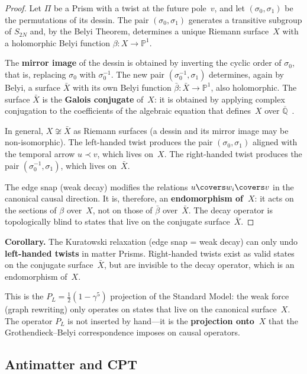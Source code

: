 \begin{proof}
Let $\Pi$ be a Prism with a twist at the future pole~$v$, and let
$(\sigma_0, \sigma_1)$ be the permutations of its dessin. The pair
$(\sigma_0, \sigma_1)$ generates a transitive subgroup of $S_{2N}$
and, by the Belyi Theorem, determines a unique Riemann
surface~$X$ with a holomorphic Belyi function
$\beta \colon X \to \mathbb{P}^1$.

The \textbf{mirror image} of the dessin is obtained by inverting the
cyclic order of $\sigma_0$, that is, replacing $\sigma_0$ with
$\sigma_0^{-1}$. The new pair $(\sigma_0^{-1}, \sigma_1)$ determines,
again by Belyi, a surface $\bar{X}$ with its own Belyi
function $\bar{\beta} \colon \bar{X} \to \mathbb{P}^1$, also
holomorphic. The surface $\bar{X}$ is the \textbf{Galois conjugate}
of~$X$: it is obtained by applying complex conjugation to the
coefficients of the algebraic equation that defines~$X$ over
$\overline{\mathbb{Q}}$~\cite{grothendieck1984,lando2004}.

In general, $X \not\cong \bar{X}$ as Riemann surfaces (a
dessin and its mirror image may be non-isomorphic). The left-handed
twist produces the pair $(\sigma_0, \sigma_1)$ aligned with the
temporal arrow $u \prec v$, which lives on~$X$. The right-handed twist
produces the pair $(\sigma_0^{-1}, \sigma_1)$, which lives on~$\bar{X}$.

The edge snap (weak decay) modifies the
relations $u \covers w_i \covers v$ in the canonical causal
direction. It is, therefore, an \textbf{endomorphism of~$X$}: it acts
on the sections of $\beta$ over~$X$, not on those of $\bar{\beta}$
over~$\bar{X}$. The decay operator is topologically
blind to states that live on the conjugate surface~$\bar{X}$.
\end{proof}

\smallskip\noindent\textbf{Corollary.}
The Kuratowski relaxation (edge snap = weak
decay) can only undo \textbf{left-handed twists} in matter
Prisms. Right-handed twists exist as valid states on
the conjugate surface~$\bar{X}$, but are invisible to the
decay operator, which is an endomorphism of~$X$.
\smallskip

This is the $P_L = \tfrac{1}{2}(1-\gamma^5)$ projection of the Standard
Model: the weak force (graph rewriting) only operates on
states that live on the canonical surface~$X$. The operator $P_L$
is not inserted by hand---it is the \textbf{projection onto~$X$} that the
Grothendieck--Belyi correspondence imposes on causal
operators.

\subsection{Antimatter and CPT}

